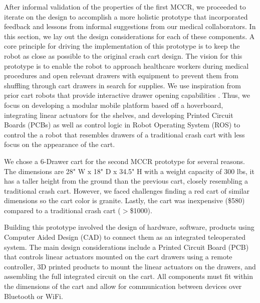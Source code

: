 After informal validation of the properties of the first MCCR, we proceeded to iterate on the design to accomplish a more holistic prototype that incorporated feedback and lessons from informal suggestions from our medical collaborators. 
In this section, we lay out the design considerations for each of these components. 
A core principle for driving the implementation of this prototype is to keep the robot as close as possible to the original crash cart design. 
The vision for this prototype is to enable the robot to approach healthcare workers during medical procedures and open relevant drawers with equipment to prevent them from shuffling through cart drawers in search for supplies.
We use inspiration from prior cart robots that provide interactive drawer opening capabilities \cite{mok2015place}.
Thus, we focus on developing a modular mobile platform based off a hoverboard, integrating linear actuators for the shelves, and developing Printed Circuit Boards (PCBs) as well as control logic in Robot Operating System (ROS) to control the a robot that resembles drawers of a traditional crash cart with less focus on the appearance of the cart.

We chose a 6-Drawer cart for the second MCCR prototype for several reasons. 
The dimensions are 28" W x 18" D x 34.5" H with a weight capacity of 300 lbs, it has a taller height from the ground than the previous cart, closely resembling a traditional crash cart.
However, we faced challenges finding a red cart of similar dimensions so the cart color is granite.
Lastly, the cart was inexpensive (\$580) compared to a traditional crash cart ($>$\$1000).


Building this prototype involved the design of hardware, software, products using Computer Aided Design (CAD) to connect them as an integrated teleoperated system.
The main design considerations include a Printed Circuit Board (PCB) that controls linear actuators mounted on the cart drawers using a remote controller, 3D printed products to mount the linear actuators on the drawers, and assembling the full integrated circuit on the cart.
All components must fit within the dimensions of the cart and allow for communication between devices over Bluetooth or WiFi.

